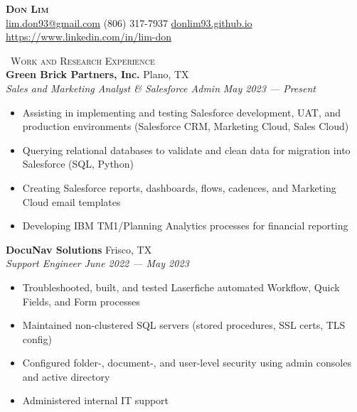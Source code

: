 \documentclass[a4paper,11pt]{article}
\newcommand{\header} [1] {
    \vspace{1mm}
    {\textsc{\large{\xrfill[0.5ex]{0.5pt}~#1~\xrfill[0.5ex]{0.5pt}}}} %
}
\begin{document}
\vspace*{-45pt}
\fontsize{11}{11.5}\selectfont


\vspace*{1mm}
\begin{center}
    {\Huge\textbf\textsc{{{Don Lim}}}}\\ \vspace{1mm}
    \href{mailto:lim.don93@gmail.com}{lim.don93@gmail.com}  (806) 317-7937  \href{https://donlim93.github.io/}{donlim93.github.io}  \href{https://www.linkedin.com/in/lim-don/}{https://www.linkedin.com/in/lim-don} \\
\end{center}
\vspace*{-2mm}

\header{Work and Research Experience} \\
\vspace{1mm}
\textbf{Green Brick Partners, Inc.} \hfill Plano, TX \\
\textit{Sales and Marketing Analyst \& Salesforce Admin} \hfill  \emph{May 2023 --- Present} \\
\begin{itemize}
    \item Assisting in implementing and testing Salesforce development, UAT, and production environments (Salesforce CRM, Marketing Cloud, Sales Cloud) 
    \item Querying relational databases to validate and clean data for migration into Salesforce (SQL, Python)
    \item Creating Salesforce reports, dashboards, flows, cadences, and Marketing Cloud email templates
    \item Developing IBM TM1/Planning Analytics processes for financial reporting
\end{itemize}
\vspace{1mm}

\textbf{DocuNav Solutions} \hfill Frisco, TX \\
\textit{Support Engineer} \hfill  \emph{June 2022 --- May 2023} \\
\begin{itemize}
    \item Troubleshooted, built, and tested Laserfiche automated Workflow, Quick Fields, and Form processes
    \item Maintained non-clustered SQL servers (stored procedures, SSL certs, TLS config)
    \item Configured folder-, document-, and user-level security using admin consoles and active directory
    \item Administered internal IT support
\end{itemize}    
\vspace{1mm}
\end{document}
